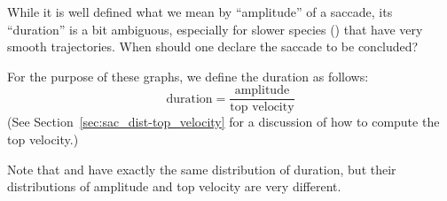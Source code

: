 
While it is well defined what we mean by ``amplitude'' of a saccade, its ``duration'' is a bit ambiguous, especially for slower species (\Dpseudoobscura) that have very smooth trajectories. When should one declare the saccade to be concluded?

For the purpose of these graphs, we define the duration as follows:
\[
	\textrm{duration} = \frac{ \textrm{amplitude}  }{ \textrm{top velocity} }
\]
(See Section~\vref{sec:sac_dist-top_velocity} for a discussion of how to compute the top velocity.)

Note that \Dananassae and \Dmelanogaster have exactly the same distribution of duration, but their distributions of amplitude and top velocity are very different.
